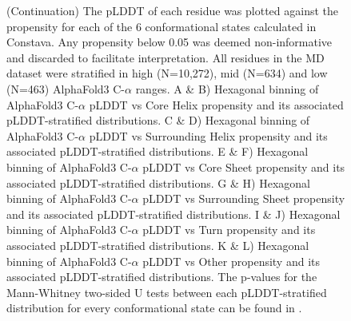 \begin{figure}[H]
{    %
    }
\label{fig:af3_plddt_vs_constava_propensities}
\end{figure}

\begin{figure}[H]
  \ContinuedFloat
  \caption[]{ (Continuation) The pLDDT of each residue was plotted against the propensity for each of the 6 conformational states calculated in Constava. Any propensity below 0.05 was deemed non-informative and discarded to facilitate interpretation. 
    All residues in the MD dataset were stratified in  high (N=10,272), mid (N=634) and low (N=463) AlphaFold3 C-$\alpha$ ranges. 
    A \& B) Hexagonal binning of AlphaFold3 C-$\alpha$ pLDDT vs Core Helix propensity and its associated pLDDT-stratified distributions. 
    C \& D) Hexagonal binning of AlphaFold3 C-$\alpha$ pLDDT vs Surrounding Helix propensity and its associated pLDDT-stratified distributions. 
    E \& F) Hexagonal binning of AlphaFold3 C-$\alpha$ pLDDT vs Core Sheet propensity and its associated pLDDT-stratified distributions. 
    G \& H) Hexagonal binning of AlphaFold3 C-$\alpha$ pLDDT vs Surrounding Sheet propensity and its associated pLDDT-stratified distributions. 
    I \& J) Hexagonal binning of AlphaFold3 C-$\alpha$ pLDDT vs Turn propensity and its associated pLDDT-stratified distributions. 
    K \& L) Hexagonal binning of AlphaFold3 C-$\alpha$ pLDDT vs Other propensity and its associated pLDDT-stratified distributions. 
    The p-values for the Mann-Whitney two-sided U tests between each pLDDT-stratified distribution for every conformational state can be found in .}
\end{figure}


